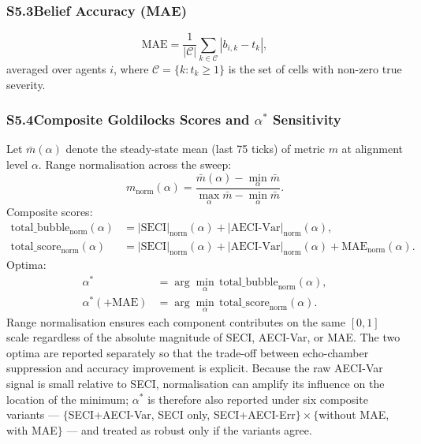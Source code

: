 \subsubsection*{S5.3\enspace Belief Accuracy (MAE)}

\begin{equation}
  \mathrm{MAE} = \frac{1}{|\mathcal{C}|}\sum_{k\in\mathcal{C}}|b_{i,k}-t_k|,
  \tag{S7}
\end{equation}
%
averaged over agents $i$, where $\mathcal{C}=\{k:t_k\geq1\}$ is the set of
cells with non-zero true severity.

\subsubsection*{S5.4\enspace Composite Goldilocks Scores and $\alpha^*$ Sensitivity}

Let $\bar{m}(\alpha)$ denote the steady-state mean (last 75 ticks) of metric $m$
at alignment level $\alpha$.
Range normalisation across the sweep:
%
\begin{equation}
  m_{\mathrm{norm}}(\alpha) =
    \frac{\bar{m}(\alpha)-\min_{\alpha}\bar{m}}
         {\max_{\alpha}\bar{m}-\min_{\alpha}\bar{m}}.
  \tag{S8}
\end{equation}
%
Composite scores:
%
\begin{align}
  \text{total\_bubble}_{\mathrm{norm}}(\alpha)
    &= |\mathrm{SECI}|_{\mathrm{norm}}(\alpha)
       +|\mathrm{AECI\text{-}Var}|_{\mathrm{norm}}(\alpha), \tag{S9}\\
  \text{total\_score}_{\mathrm{norm}}(\alpha)
    &= |\mathrm{SECI}|_{\mathrm{norm}}(\alpha)
       +|\mathrm{AECI\text{-}Var}|_{\mathrm{norm}}(\alpha)
       +\mathrm{MAE}_{\mathrm{norm}}(\alpha). \tag{S10}
\end{align}
%
Optima:
%
\begin{align}
  \alpha^* &= \arg\min_{\alpha}\,\text{total\_bubble}_{\mathrm{norm}}(\alpha), \tag{S11}\\
  \alpha^*(+\mathrm{MAE}) &= \arg\min_{\alpha}\,\text{total\_score}_{\mathrm{norm}}(\alpha). \tag{S12}
\end{align}
%
Range normalisation ensures each component contributes on the same $[0,1]$ scale
regardless of the absolute magnitude of SECI, AECI-Var, or MAE.
The two optima are reported separately so that the trade-off between
echo-chamber suppression and accuracy improvement is explicit.
Because the raw AECI-Var signal is small relative to SECI, normalisation can
amplify its influence on the location of the minimum; $\alpha^*$ is therefore
also reported under six composite variants ---
$\{$SECI+AECI-Var, SECI only, SECI+AECI-Err$\}\times\{$without MAE, with MAE$\}$
--- and treated as robust only if the variants agree.

